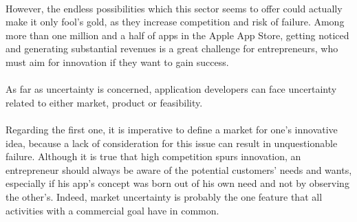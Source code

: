 \documentclass[twoside]{report}
\begin{document}
	\paragraph{}
	However, the endless possibilities which this sector seems to offer could actually make it only fool's gold, as they increase competition and risk of failure. Among more than one million and a half of apps in the Apple App Store, getting noticed and generating substantial revenues is a great challenge for entrepreneurs, who must aim for innovation if they want to gain success.
	\paragraph{}
	As far as uncertainty is concerned, application developers can face uncertainty related to either market, product or feasibility. 
	\paragraph{}
	Regarding the first one, it is imperative to define a market for one's innovative idea, because a lack of consideration for this issue can result in unquestionable failure. Although it is true that high competition spurs innovation, an entrepreneur should always be aware of the potential customers' needs and wants, especially if his app's concept was born out of his own need and not by observing the other's. Indeed, market uncertainty is probably the one feature that all activities with a commercial goal have in common.
\end{document}
